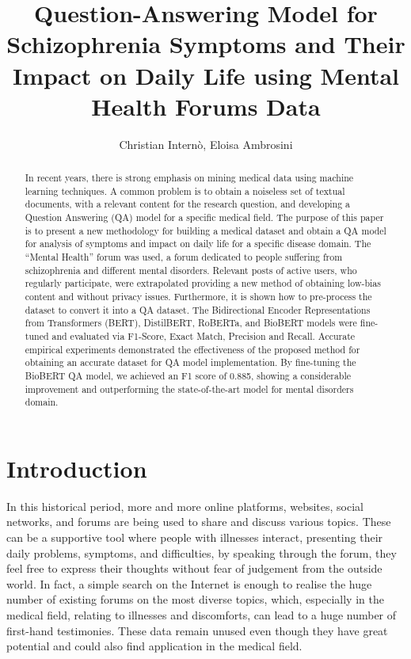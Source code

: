 \documentclass[runningheads]{llncs}
\begin{document}
\title{Question-Answering Model for Schizophrenia Symptoms and Their Impact on Daily Life using Mental Health Forums Data}
\author{Christian Internò, Eloisa Ambrosini}
\maketitle              \begin{abstract}
In recent years, there is strong emphasis on mining medical data using machine learning techniques. A common problem is to obtain a noiseless set of textual documents, with a relevant content for the research question, and developing a Question Answering (QA) model for a specific medical field. The purpose of this paper is to present a new methodology for building a medical dataset and obtain a QA model for analysis of symptoms and impact on daily life for a specific disease domain. The ``Mental Health'' forum was used, a forum dedicated to people suffering from schizophrenia and different mental disorders. Relevant posts of active users, who regularly participate, were extrapolated providing a new method of obtaining low-bias content and without privacy issues. Furthermore, it is shown how to pre-process the dataset to convert it into a QA dataset.
The Bidirectional Encoder Representations from Transformers (BERT), DistilBERT, RoBERTa, and BioBERT models were fine-tuned and evaluated via F1-Score, Exact Match, Precision and Recall. Accurate empirical experiments demonstrated the effectiveness of the proposed method for obtaining an accurate dataset for QA model implementation. By fine-tuning the BioBERT QA model, we achieved an F1 score of 0.885, showing a considerable improvement and outperforming the state-of-the-art model for mental disorders domain.

\end{abstract}
\section{Introduction}
In this historical period, more and more online platforms, websites, social networks, and forums are being used to share and discuss various topics. These can be a supportive tool where people with illnesses interact, presenting their daily problems, symptoms, and difficulties, by speaking through the forum, they feel free to express their thoughts without fear of judgement from the outside world. In fact, a simple search on the Internet is enough to realise the huge number of existing forums on the most diverse topics, which, especially in the medical field, relating to illnesses and discomforts, can lead to a huge number of first-hand testimonies. These data remain unused even though they have great potential and could also find application in the medical field. 
\end{document}
